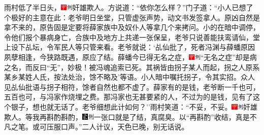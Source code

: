 雨村低了半日头，{\includegraphics[width=3mm]{../Images/00002}\includegraphics[width=3mm]{../Images/00011}\footnotesize \kaishu 奸雄欺人。}方说道：``依你怎么样？''门子道：``小人已想了个极好的主意在此：老爷明日坐堂，只管虚张声势，动文书发签拿人。原凶自然是拿不来的，原告固是定要将薛家族中及奴仆人等拿几个来拷问。小的在暗中调停，令他们报个暴病身亡，合族中及地方上共递一张保呈，老爷只说善能扶鸾请仙，堂上设下乩坛，令军民人等只管来看。老爷就说：`乩仙批了，死者冯渊与薛蟠原因夙孽相逢，今狭路既遇，原应了结。薛蟠今已得无名之症，{\includegraphics[width=3mm]{../Images/00002}\includegraphics[width=3mm]{../Images/00011}\footnotesize \kaishu ``无名之症''却是病之名，而反曰``无''，妙极！}被冯魂追索已死。其祸皆由拐子某人而起，拐之人原系某乡某姓人氏，按法处治，馀不略及'等语。小人暗中嘱托拐子，令其实招。众人见乩仙批语与拐子相符，馀者自然也都不虚了。薛家有的是钱，老爷断一千也可，五百也可，与冯家作烧埋之费。那冯家也无甚要紧的人，不过为的是钱，见有了这个银子，想也就无话了。老爷细想此计如何？''雨村笑道：``不妥，不妥。{\includegraphics[width=3mm]{../Images/00002}\includegraphics[width=3mm]{../Images/00011}\footnotesize \kaishu 奸雄欺人。}等我再斟酌斟酌，{\includegraphics[width=3mm]{../Images/00006}\includegraphics[width=3mm]{../Images/00011}\footnotesize \kaishu 一张口就是了结，真腐臭。以``再斟酌''收结，真是不凡之笔。}或可压服口声。''二人计议，天色已晚，别无话说。

